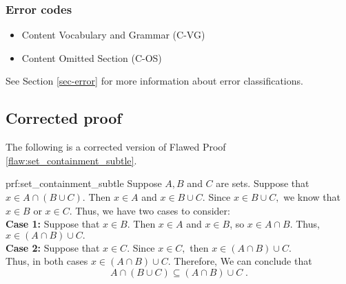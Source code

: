  
\subsubsection{Error codes}
\begin{itemize}
	\item 	Content Vocabulary and Grammar (C-VG)
	\item   Content Omitted Section (C-OS)
\end{itemize}
See Section \ref{sec-error} for more information about error classifications.

\clearpage
\subsection{Corrected proof}

The following is a corrected version of Flawed Proof \ref{flaw:set_containment_subtle}. %

\begin{prf}{prf:set_containment_subtle} %
Suppose $A, B$ and $C$ are sets. Suppose that $x \in A \cap \left(B \cup C \right).$ Then $x\in A$ and $x \in B \cup C.$ Since $x \in B \cup C,$ we know that $x \in B$ or $x \in C.$ Thus, we have two cases to consider: \\

\noindent \textbf{Case 1:} Suppose that $x \in B$. Then $x \in A$ and $x \in B$, so $x \in A \cap B$. Thus, $x \in \left(A \cap B\right) \cup C.$ \\
\textbf{Case 2:}  Suppose that $x \in C$. Since $x \in C,$ then $x \in \left(A \cap B\right) \cup C.$ \\

\noindent Thus, in both cases $x \in \left(A \cap B\right) \cup C.$ Therefore, We can conclude that $$A \cap \left(B \cup C \right) \subseteq \left(A \cap B\right) \cup C\;.$$
\end{prf}
